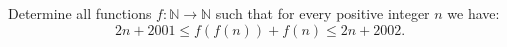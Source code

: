 Determine all functions $f: \mathbb N\to \mathbb N$ such that for every positive integer $n$ we have: \[ 2n+2001\leq f(f(n))+f(n)\leq 2n+2002. \]